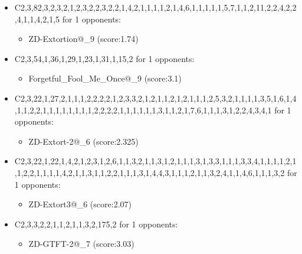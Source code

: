 \begin{appendices}
\begin{itemize}
        \item C2,3,82,3,2,3,2,1,2,3,2,2,3,2,2,1,4,2,1,1,1,1,2,1,4,6,1,1,1,1,1,5,7,1,1,2,11,2,2,4,2,2,4,1,1,4,2,1,5 for 1 opponents:
        \begin{multicols}{3}
            \begin{itemize}

                \item ZD-Extortion@\_9 (score:1.74)
            \end{itemize}
        \end{multicols}

        \item C2,3,54,1,36,1,29,1,23,1,31,1,15,2 for 1 opponents:
        \begin{multicols}{3}
            \begin{itemize}
                \item Forgetful\_Fool\_Me\_Once@\_9 (score:3.1)
            \end{itemize}
        \end{multicols}

        \item C2,3,22,1,27,2,1,1,1,2,2,2,2,1,2,3,3,2,1,2,1,1,2,1,2,1,1,1,2,5,3,2,1,1,1,1,3,5,1,6,1,4,1,1,2,2,1,1,1,1,1,1,1,1,2,2,2,2,1,1,1,1,1,1,3,1,1,2,1,7,6,1,1,1,3,1,2,2,4,3,4,1 for 1 opponents:
        \begin{multicols}{3}
            \begin{itemize}
                \item ZD-Extort-2@\_6 (score:2.325)
            \end{itemize}
        \end{multicols}

        \item C2,3,22,1,22,1,4,2,1,2,3,1,2,6,1,1,3,2,1,1,3,1,2,1,1,1,3,1,3,3,1,1,1,3,3,4,1,1,1,1,2,1,1,2,2,1,1,1,1,4,2,1,1,3,1,1,2,2,1,1,1,3,1,4,4,3,1,1,1,2,1,1,3,2,4,1,1,4,6,1,1,1,3,2 for 1 opponents:
        \begin{multicols}{3}
            \begin{itemize}
                \item ZD-Extort3@\_6 (score:2.07)
            \end{itemize}
        \end{multicols}

        \item C2,3,3,2,2,1,1,2,1,1,3,2,175,2 for 1 opponents:
        \begin{multicols}{3}
            \begin{itemize}
                \item ZD-GTFT-2@\_7 (score:3.03)
            \end{itemize}
        \end{multicols}


\end{itemize}
\end{appendices}
